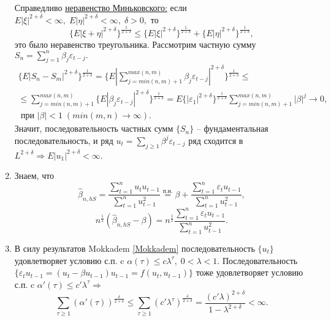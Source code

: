 \begin{Proof}
\begin{enumerate}
        Справедливо \underline{неравенство Миньковского:} если $E|\xi|^{2 + \delta} < \infty, \; E|\eta|^{2 + \delta} < \infty, \; \delta > 0, $ то
        $$\lbrace E|\xi + \eta|^{2 + \delta} \rbrace^{\frac{1}{2 + \delta}} \leq \lbrace E|\xi|^{2 + \delta} \rbrace^{\frac{1}{2 + \delta}} + \lbrace E|\eta|^{2 + \delta} \rbrace^{\frac{1}{2 + \delta}},$$
        это было неравенство треугольника. Рассмотрим частную сумму $S_n = \sum\limits_{j = 1}^n \beta_j \varepsilon_{t - j}.$
        $$\begin{gathered}
            \lbrace E|S_n - S_m|^{2 + \delta} \rbrace^{\frac{1}{2 + \delta}} = \lbrace E|\sum\limits_{j = min(n, m) + 1}^{max(n, m)} \beta_j \varepsilon_{t - j}|^{2 + \delta} \rbrace^{\frac{1}{2 + \delta}} \leq\\
            \leq \sum\limits_{j = min(n, m) + 1}^{max(n, m)} \lbrace E|\beta_j \varepsilon_{t - j}|^{2 + \delta} \rbrace^{\frac{1}{2 + \delta}} = E\lbrace |\varepsilon_1|^{2 + \delta} \rbrace^{\frac{1}{2 + \delta}} \sum\limits_{j = min(n, m) + 1}^{max(n, m)} |\beta|^j \rightarrow 0,\\ 
            \text{ при } |\beta| < 1 \; (min(m, n) \rightarrow \infty).
        \end{gathered}$$
        Значит, последовательность частных сумм $\lbrace S_n \rbrace$ -- фундаментальная последовательность, и ряд $u_t = \sum\limits_{j \geq 1} \beta^j \varepsilon_{t - j}$  
        ряд сходится в $L^{2 + \delta} \Longrightarrow E|u_1|^{2 + \delta} < \infty$.
        \item Знаем, что
        $$\hat{\beta}_{n, hS} = \dfrac{\sum\limits_{t = 1}^n u_t u_{t - 1}}{\sum\limits_{t = 1}^n u_{t - 1}^2} \stackrel{\text{п.н.}}{=} \beta + \dfrac{\sum\limits_{t = 1}^n \varepsilon_t u_{t - 1}}{\sum\limits_{t = 1}^n u_{t - 1}^2},$$
        $$n^{\frac{1}{2}}(\hat{\beta}_{n, hS} - \beta) = n^{\frac{1}{2}} \dfrac{\sum\limits_{t = 1}^n \varepsilon_t u_{t - 1}}{\sum\limits_{t = 1}^n u_{t - 1}^2}.$$
        \item В силу результатов Mokkadem \ref{Mokkadem} последовательность $\lbrace u_t \rbrace$ удовлетворяет условию с.п. c $\alpha(\tau) \leq c\lambda^{\tau}, \; 0 < \lambda < 1.$ Последовательность $\lbrace \varepsilon_t u_{t - 1} = (u_t - \beta u_{t - 1})u_{t - 1} = f(u_t, u_{t - 1}) \rbrace$ тоже удовлетворяет условию с.п. c $\alpha'(\tau) \leq c' \lambda^{\tau} \Longrightarrow$
        $$\sum\limits_{\tau \geq 1}(\alpha'(\tau))^{\frac{\delta}{2 + \delta}} \leq \sum\limits_{\tau \geq 1}(c' \lambda^{\tau})^{\frac{\delta}{2 + \delta}} = \dfrac{(c' \lambda)^{2 + \delta}}{1 - \lambda^{2 + \delta}} < \infty.$$

\end{enumerate}
\end{Proof}

